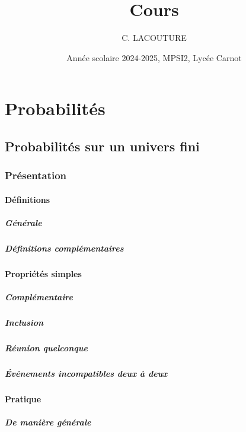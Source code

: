 \documentclass[12pt,a4paper,french]{book}
\title{Cours}
\author{C. LACOUTURE}
\date{Année scolaire 2024-2025, MPSI2, Lycée Carnot}
\begin{document}
\maketitle
\tableofcontents
\part{Probabilités}

\chapter{Probabilités sur un univers fini}
	\section{Présentation}
		\subsection{Définitions}
			\subsubsection{Générale}
			\subsubsection{Définitions complémentaires}
		\subsection{Propriétés simples}
			\subsubsection{Complémentaire}
			\subsubsection{Inclusion}
			\subsubsection{Réunion quelconque}
			\subsubsection{Événements incompatibles deux à deux}
		\subsection{Pratique}
			\subsubsection{De manière générale}
\end{document}
